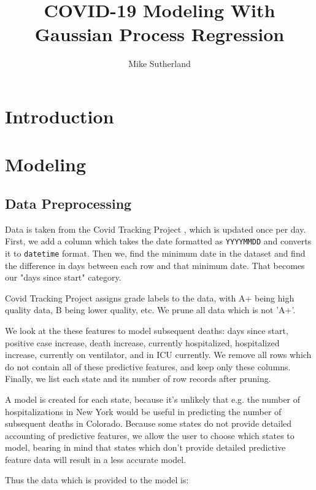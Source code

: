 \documentclass[11pt,letterpaper]{article}
\author{Mike Sutherland}
\title{COVID-19 Modeling With Gaussian Process Regression}
\begin{document}
	\section{Introduction}
	\section{Modeling}
		\subsection{Data Preprocessing}
		\par Data is taken from the Covid Tracking Project \cite{covidtracking}, which is updated once per day. First, we add a column which takes the date formatted as \texttt{YYYYMMDD} and converts it to \texttt{datetime} format. Then we, find the minimum date in the dataset and find the difference in days between each row and that minimum date. That becomes our "days since start" category.
		
		\par Covid Tracking Project assigns grade labels to the data, with A+ being high quality data, B being lower quality, etc. We prune all data which is not 'A+'.
		
		\par We look at the these features to model subsequent deaths: days since start, positive case increase, death increase, currently hospitalized, hospitalized increase, currently on ventilator, and in ICU currently. We remove all rows which do not contain all of these predictive features, and keep only these columns. Finally, we list each state and its number of row records after pruning. 
		
		\par A model is created for each state, because it's unlikely that e.g. the number of hospitalizations in New York would be useful in predicting the number of subsequent deaths in Colorado. Because some states do not provide detailed accounting of predictive features, we allow the user to choose which states to model, bearing in mind that states which don't provide detailed predictive feature data will result in a less accurate model.
		
		\par Thus the data which is provided to the model is:
		
\end{document}
